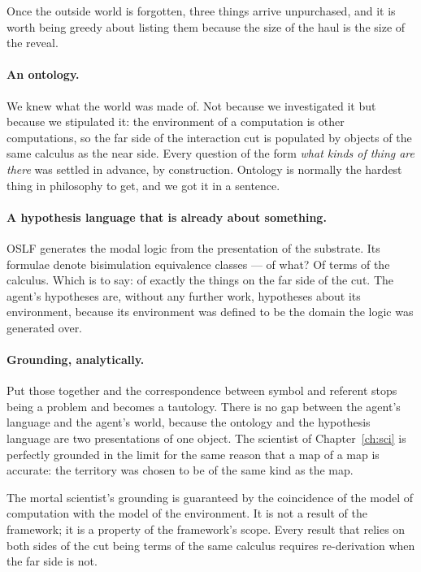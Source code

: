 Once the outside world is forgotten, three things arrive
unpurchased, and it is worth being greedy about listing them
because the size of the haul is the size of the reveal.

\paragraph{An ontology.}
We knew what the world was made of.
Not because we investigated it but because we stipulated it: the
environment of a computation is other computations, so the far side
of the interaction cut is populated by objects of the same calculus
as the near side.
Every question of the form \emph{what kinds of thing are there} was
settled in advance, by construction.
Ontology is normally the hardest thing in philosophy to get, and we
got it in a sentence.

\paragraph{A hypothesis language that is already about something.}
OSLF generates the modal logic from the presentation of the
substrate.
Its formulae denote bisimulation equivalence classes --- of what?
Of terms of the calculus.
Which is to say: of exactly the things on the far side of the cut.
The agent's hypotheses are, without any further work, hypotheses
about its environment, because its environment was defined to be
the domain the logic was generated over.

\paragraph{Grounding, analytically.}
Put those together and the correspondence between symbol and
referent stops being a problem and becomes a tautology.
There is no gap between the agent's language and the agent's world,
because the ontology and the hypothesis language are two
presentations of one object.
The scientist of Chapter~\ref{ch:sci} is perfectly grounded in the
limit for the same reason that a map of a map is accurate: the
territory was chosen to be of the same kind as the map.

\begin{observation}
\label{obs:sidestep}
The mortal scientist's grounding is guaranteed by the coincidence
of the model of computation with the model of the environment.
It is not a result of the framework; it is a property of the
framework's scope.
Every result that relies on both sides of the cut being terms of
the same calculus requires re-derivation when the far side is not.
\end{observation}

